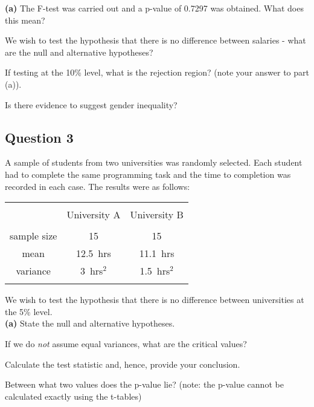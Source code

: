 \documentclass[a4paper,12pt]{article}
\begin{document}
{\bf(a)} The F-test was carried out and a p-value of 0.7297 was obtained. What does this mean? 
 
\item  We wish to test the hypothesis that there is no difference between salaries - what are the null and alternative hypotheses? 
 
\item  If testing at the 10\% level, what is the rejection region? (note your answer to part (a)). 
 
\item  Is there evidence to suggest gender inequality?



\subsection*{Question 3}
A sample of students from two universities was randomly selected. Each student had to complete the same programming task and the time to completion was recorded in each case. The results were as follows: \\

\begin{center}
\begin{tabular}{|c|c|c|}
\hline
&&\\[-0.4cm]
& University A & University B \\
\hline
&&\\[-0.4cm]
sample size & 15 & 15 \\
mean & 12.5\,\,\,hrs & 11.1\,\,\,hrs \\
variance & 3\,\,\,hrs$^2$ & 1.5\,\,\,hrs$^2$ \\
\hline
\multicolumn{3}{c}{}\\
\end{tabular}
\end{center}

We wish to test the hypothesis that there is no difference between universities at the 5\% level.\\[0.2cm]
{\bf(a)} State the null and alternative hypotheses. 
 
\item  If we do \emph{not} assume equal variances, what are the critical values? 
 
\item  Calculate the test statistic and, hence, provide your conclusion. 
 
\item  Between what two values does the p-value lie? (note: the p-value cannot be calculated exactly using the t-tables)
\end{document}
